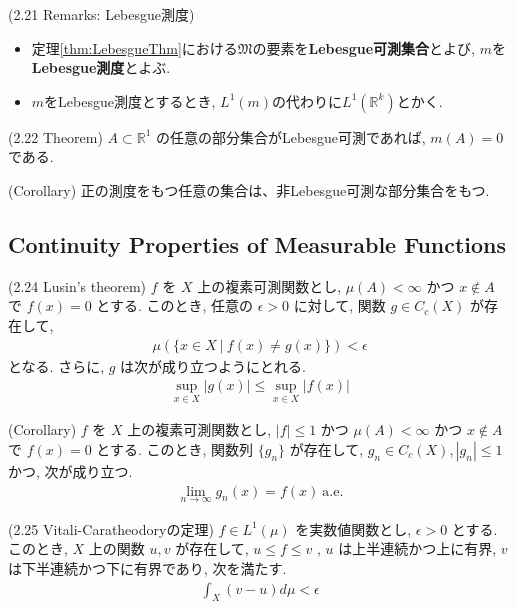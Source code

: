 \documentclass[a4paper]{jsarticle}
\begin{document}
\begin{defi}{(2.21 Remarks: Lebesgue測度)}{}
    \begin{itemize}
        \item 定理\ref{thm:LebesgueThm}における$\mathfrak{M}$の要素を{\bf Lebesgue可測集合}とよび, $m$を{\bf Lebesgue測度}とよぶ.
        \item $m$をLebesgue測度とするとき, $L^1(m)$の代わりに$L^1(\mathbb{R}^k)$とかく.
    \end{itemize}
\end{defi}

\begin{thm}{(2.22 Theorem)}{}
    \( A \subset \mathbb{R}^1 \) の任意の部分集合がLebesgue可測であれば, \( m(A)=0 \)である.
\end{thm}
\begin{cor}{(Corollary)}{}
    正の測度をもつ任意の集合は、非Lebesgue可測な部分集合をもつ.
\end{cor}

\subsection{Continuity Properties of Measurable Functions}
\begin{thm}{(2.24 Lusin's theorem)}{}
    \( f \) を \( X \) 上の複素可測関数とし, \( \mu(A)<\infty \) かつ \( x\notin A  \) で \( f(x)=0 \) とする. このとき, 任意の \( \epsilon>0 \) に対して, 関数 \( g\in C_c(X) \) が存在して,
    \begin{align*}
        \mu(\{ x\in X \ | \ f(x)\neq g(x) \}) < \epsilon
    \end{align*}
    となる. さらに, \( g \) は次が成り立つようにとれる. 
    \begin{align*}
        \sup_{x\in X} |g(x)|\leq \sup_{x\in X} |f(x)|
    \end{align*}
\end{thm}

\begin{cor}{(Corollary)}{}
    \( f \) を \( X \) 上の複素可測関数とし, \( |f|\leq 1 \) かつ \( \mu(A)<\infty \) かつ \( x\notin A  \) で \( f(x)=0 \) とする. このとき, 関数列 \( \{g_n\} \) が存在して, \( g_n\in C_c(X), |g_n|\leq 1 \) かつ, 次が成り立つ. 
    \begin{align*}
        \lim_{n\to \infty} g_n(x) = f(x) \ \text{a.e.}
    \end{align*}
\end{cor}

\begin{thm}{(2.25 Vitali-Caratheodoryの定理)}{}
    \( f\in L^1(\mu) \) を実数値関数とし, \( \epsilon>0 \) とする. このとき, \( X \) 上の関数 \( u, v\) が存在して, \( u\leq f\leq v \) , \( u \) は上半連続かつ上に有界, \( v \) は下半連続かつ下に有界であり, 次を満たす. 
    \begin{align*}
        \int_X (v-u)d\mu < \epsilon
    \end{align*}
\end{thm}
\end{document}

